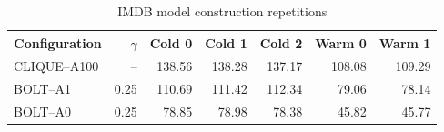 \begin{table}[H]
\centering
\small
\setlength{\tabcolsep}{5pt}
\caption{IMDB model construction repetitions}
\label{tab:E_repetitions_IMDB}
\begin{tabular}{@{}lrrrrrr@{}}
\toprule
Configuration & $\gamma$ & Cold 0 & Cold 1 & Cold 2 & Warm 0 & Warm 1 \\
\midrule
CLIQUE--A100 & -- & 138.56 & 138.28 & 137.17 & 108.08 & 109.29 \\
BOLT--A1 & 0.25 & 110.69 & 111.42 & 112.34 & 79.06 & 78.14 \\
BOLT--A0 & 0.25 & 78.85 & 78.98 & 78.38 & 45.82 & 45.77 \\
\bottomrule
\end{tabular}
\end{table}
